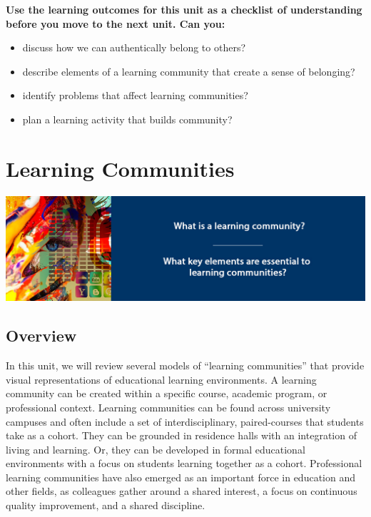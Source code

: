 \documentclass[
]{book}
\providecommand{\tightlist}{%
  \setlength{\itemsep}{0pt}\setlength{\parskip}{0pt}}
\begin{document}
\begin{progress}
\textbf{Use the learning outcomes for this unit as a checklist of
understanding before you move to the next unit. Can you:}

\begin{itemize}
\tightlist
\item
  discuss how we can authentically belong to others?\\
\item
  describe elements of a learning community that create a sense of
  belonging?\\
\item
  identify problems that affect learning communities?\\
\item
  plan a learning activity that builds community?
\end{itemize}
\end{progress}

\hypertarget{learning-communities}{%
\chapter{Learning Communities}\label{learning-communities}}

\includegraphics{assets/unit4/LDRS664-BannerUnit4.jpg}

\hypertarget{overview-3}{%
\section*{Overview}\label{overview-3}}

In this unit, we will review several models of ``learning communities'' that provide visual representations of educational learning environments. A learning community can be created within a specific course, academic program, or professional context. Learning communities can be found across university campuses and often include a set of interdisciplinary, paired-courses that students take as a cohort. They can be grounded in residence halls with an integration of living and learning. Or, they can be developed in formal educational environments with a focus on students learning together as a cohort. Professional learning communities have also emerged as an important force in education and other fields, as colleagues gather around a shared interest, a focus on continuous quality improvement, and a shared discipline.
\end{document}
